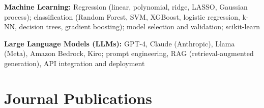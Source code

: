 \documentclass[11pt,a4paper]{article}
\begin{document}
\begin{skillbox}
\textbf{Machine Learning:} Regression (linear, polynomial, ridge, LASSO, Gaussian process); classification (Random Forest, SVM, XGBoost, logistic regression, k-NN, decision trees, gradient boosting); model selection and validation; scikit-learn
\end{skillbox}

\begin{skillbox}
\textbf{Large Language Models (LLMs):} GPT-4, Claude (Anthropic), Llama (Meta), Amazon Bedrock, Kiro; prompt engineering, RAG (retrieval-augmented generation), API integration and deployment
\end{skillbox}

\section{Journal Publications}
\end{document}
